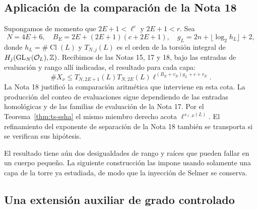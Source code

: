 \subsection{Aplicación de la comparación de la Nota 18}

Supongamos de momento que $2E+1<\ell^c$ y $2E+1<r$. Sea
\begin{equation}
 N=4E+6,\quad B_E=2E+(2E+1)(c+2E+1),\quad
 g_L=2n+\lfloor\log_2 h_L\rfloor+2,
 \label{eq:ts-param}
\end{equation}
donde $h_L=\#\operatorname{Cl}(L)$ y $T_{N,j}(L)$ es el orden de la torsión integral de $H_j(\operatorname{GL}_N(\mathcal O_L),\mathbb{Z})$. Recibimos de las Notas 15, 17 y 18, bajo las entradas de evaluación y rango allí indicadas, el resultado para cada capa:
\begin{equation}
 \#X_\nu\le T_{N,2E+1}(L)T_{N,2E}(L)
 \ell^{(B_E+v_E)g_L+c+v_E}.
 \label{eq:ts-clases}
\end{equation}
La Nota 18 justificó la comparación aritmética que interviene en esta cota. La producción del conteo de evaluaciones sigue dependiendo de las entradas homológicas y de las familias de evaluación de la Nota 17. Por el Teorema~\ref{thm:ts-ssha} el mismo miembro derecho acota $\ell^{s_{\ell,E}(L)}$. El refinamiento del exponente de separación de la Nota 18 también se transporta si se verifican sus hipótesis.

El resultado tiene aún dos desigualdades de rango y raíces que pueden fallar en un cuerpo pequeño. La siguiente construcción las impone usando solamente una capa de la torre ya estudiada, de modo que la inyección de Selmer se conserva.

\subsection{Una extensión auxiliar de grado controlado}

